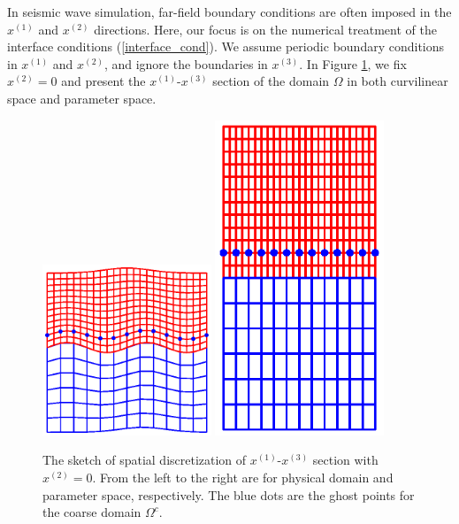 In seismic wave simulation, far-field boundary conditions are often imposed in the $x^{(1)}$ and $x^{(2)}$ directions. Here, our focus is on the numerical treatment of the interface conditions (\ref{interface_cond}). We assume periodic boundary conditions in $x^{(1)}$ and $x^{(2)}$, and ignore the boundaries in $x^{(3)}$. In Figure \ref{section_discretization}, we fix $x^{(2)} = 0$ and present the $x^{(1)}$-$x^{(3)}$ section of the domain $\Omega$ in both curvilinear space and parameter space.
\begin{figure}[htbp]
	\centering
	\includegraphics[width=0.45\textwidth,trim={1.0cm 2.0cm 1.0cm 1.8cm}, clip]{physical_section_discretization.eps}
	\includegraphics[width=0.45\textwidth,trim={1.0cm 2.0cm 1cm 1.8cm}, clip]{parameter_section_discretization.eps}
	\caption{The sketch of spatial discretization of $x^{(1)}$-$x^{(3)}$ section with $x^{(2)} = 0$. From the left to the right are for physical domain and parameter space, respectively. The blue dots are the ghost points for the coarse domain $\Omega^c$.}\label{section_discretization}
\end{figure}

